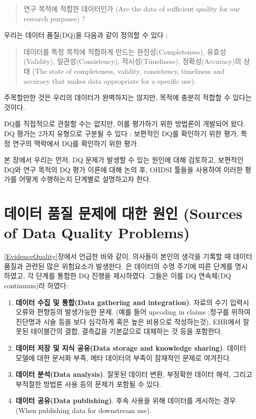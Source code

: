 \documentclass[11pt]{book}
\providecommand{\tightlist}{%
  \setlength{\itemsep}{0pt}\setlength{\parskip}{0pt}}
\theoremstyle{definition}
\theoremstyle{definition}
\theoremstyle{definition}
\theoremstyle{remark}
\begin{document}
\begin{quote}
연구 목적에 적합한 데이터인가 (Are the data of sufficient quality for
our research purposes) ?
\end{quote}

우리는 데이터 품질(DQ)을 다음과 같이 정의할 수 있다
\citep{roebuck_2012}: 

\begin{quote}
데이터를 특정 목적에 적합하게 만드는 완전성(Completeness),
유효성(Validity), 일관성(Consistency), 적시성(Timeliness),
정확성(Accuracy)의 상태 (The state of completeness, validity,
consistency, timeliness and accuracy that makes data appropriate for a
specific use).
\end{quote}

주목할만한 것은 우리의 데이터가 완벽하지는 않지만, 목적에 충분히 적합할
수 있다는 것이다.

DQ를 직접적으로 관찰할 수는 없지만, 이를 평가하기 위한 방법론이 개발되어
왔다. DQ 평가는 2가지 유형으로 구분될 수 있다 \citep{weiskopf_2013}:
보편적인 DQ를 확인하기 위한 평가, 특정 연구의 맥락에서 DQ를 확인하기
위한 평가.

본 장에서 우리는 먼저, DQ 문제가 발생할 수 있는 원인에 대해 검토하고,
보편적인 DQ와 연구 목적의 DQ 평가 이론에 대해 논의 후, OHDSI 툴들을
사용하여 이러한 평가를 어떻게 수행하는지 단계별로 설명하고자 한다.

\section{데이터 품질 문제에 대한 원인 (Sources of Data Quality
Problems)}\label{-----sources-of-data-quality-problems}

\ref{EvidenceQuality}장에서 언급한 바와 같이, 의사들이 본인의 생각을
기록할 때 데이터 품질과 관련된 많은 위험요소가 발생한다.
\citet{dasu_2003} 은 데이터의 수명 주기에 따른 단계를 명시하였고, 각
단계를 통합한 DQ 진행을 제시하였다. 그들은 이를 DQ 연속체(DQ
continuum)라 하였다:

\begin{enumerate}
\def\labelenumi{\arabic{enumi}.}
\tightlist
\item
  \textbf{데이터 수집 및 통합(Data gathering and integration)}. 자료의
  수기 입력시 오류와 편향등의 발생가능한 문제. (예를 들어 upcoding in
  claims ;청구를 위하여 진단명과 시술 등을 보다 심각하게 혹은 높은
  비용으로 작성하는것), EHR에서 잘못된 테이블간의 결합, 결측값을
  기본값으로 대체하는 것 등을 포함한다.
\item
  \textbf{데이터 저장 및 지식 공유(Data storage and knowledge sharing)}.
  데이터 모델에 대한 문서화 부족, 메타 데이터의 부족이 잠재적인 문제로
  여겨진다.
\item
  \textbf{데이터 분석(Data analysis)}. 잘못된 데이터 변환, 부정확한
  데이터 해석, 그리고 부적절한 방법론 사용 등의 문제가 포함될 수 있다.\\
\item
  \textbf{데이터 공유(Data publishing)}. 후속 사용을 위해 데이터를
  게시하는 경우 (When publishing data for downstream use).
\end{enumerate}
\end{document}
